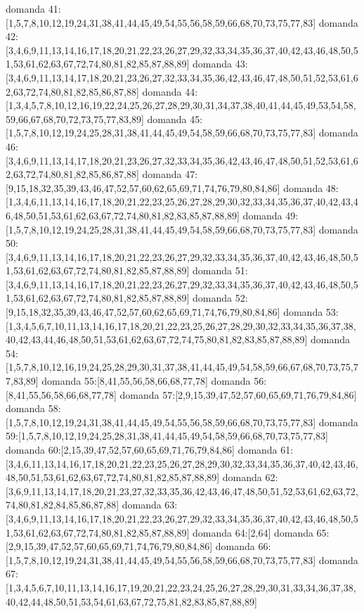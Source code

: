 domanda 41:[1,5,7,8,10,12,19,24,31,38,41,44,45,49,54,55,56,58,59,66,68,70,73,75,77,83]
domanda 42:[3,4,6,9,11,13,14,16,17,18,20,21,22,23,26,27,29,32,33,34,35,36,37,40,42,43,46,48,50,51,53,61,62,63,67,72,74,80,81,82,85,87,88,89]
domanda 43:[3,4,6,9,11,13,14,17,18,20,21,23,26,27,32,33,34,35,36,42,43,46,47,48,50,51,52,53,61,62,63,72,74,80,81,82,85,86,87,88]
domanda 44:[1,3,4,5,7,8,10,12,16,19,22,24,25,26,27,28,29,30,31,34,37,38,40,41,44,45,49,53,54,58,59,66,67,68,70,72,73,75,77,83,89]
domanda 45:[1,5,7,8,10,12,19,24,25,28,31,38,41,44,45,49,54,58,59,66,68,70,73,75,77,83]
domanda 46:[3,4,6,9,11,13,14,17,18,20,21,23,26,27,32,33,34,35,36,42,43,46,47,48,50,51,52,53,61,62,63,72,74,80,81,82,85,86,87,88]
domanda 47:[9,15,18,32,35,39,43,46,47,52,57,60,62,65,69,71,74,76,79,80,84,86]
domanda 48:[1,3,4,6,11,13,14,16,17,18,20,21,22,23,25,26,27,28,29,30,32,33,34,35,36,37,40,42,43,46,48,50,51,53,61,62,63,67,72,74,80,81,82,83,85,87,88,89]
domanda 49:[1,5,7,8,10,12,19,24,25,28,31,38,41,44,45,49,54,58,59,66,68,70,73,75,77,83]
domanda 50:[3,4,6,9,11,13,14,16,17,18,20,21,22,23,26,27,29,32,33,34,35,36,37,40,42,43,46,48,50,51,53,61,62,63,67,72,74,80,81,82,85,87,88,89]
domanda 51:[3,4,6,9,11,13,14,16,17,18,20,21,22,23,26,27,29,32,33,34,35,36,37,40,42,43,46,48,50,51,53,61,62,63,67,72,74,80,81,82,85,87,88,89]
domanda 52:[9,15,18,32,35,39,43,46,47,52,57,60,62,65,69,71,74,76,79,80,84,86]
domanda 53:[1,3,4,5,6,7,10,11,13,14,16,17,18,20,21,22,23,25,26,27,28,29,30,32,33,34,35,36,37,38,40,42,43,44,46,48,50,51,53,61,62,63,67,72,74,75,80,81,82,83,85,87,88,89]
domanda 54:[1,5,7,8,10,12,16,19,24,25,28,29,30,31,37,38,41,44,45,49,54,58,59,66,67,68,70,73,75,77,83,89]
domanda 55:[8,41,55,56,58,66,68,77,78]
domanda 56:[8,41,55,56,58,66,68,77,78]
domanda 57:[2,9,15,39,47,52,57,60,65,69,71,76,79,84,86]
domanda 58:[1,5,7,8,10,12,19,24,31,38,41,44,45,49,54,55,56,58,59,66,68,70,73,75,77,83]
domanda 59:[1,5,7,8,10,12,19,24,25,28,31,38,41,44,45,49,54,58,59,66,68,70,73,75,77,83]
domanda 60:[2,15,39,47,52,57,60,65,69,71,76,79,84,86]
domanda 61:[3,4,6,11,13,14,16,17,18,20,21,22,23,25,26,27,28,29,30,32,33,34,35,36,37,40,42,43,46,48,50,51,53,61,62,63,67,72,74,80,81,82,85,87,88,89]
domanda 62:[3,6,9,11,13,14,17,18,20,21,23,27,32,33,35,36,42,43,46,47,48,50,51,52,53,61,62,63,72,74,80,81,82,84,85,86,87,88]
domanda 63:[3,4,6,9,11,13,14,16,17,18,20,21,22,23,26,27,29,32,33,34,35,36,37,40,42,43,46,48,50,51,53,61,62,63,67,72,74,80,81,82,85,87,88,89]
domanda 64:[2,64]
domanda 65:[2,9,15,39,47,52,57,60,65,69,71,74,76,79,80,84,86]
domanda 66:[1,5,7,8,10,12,19,24,31,38,41,44,45,49,54,55,56,58,59,66,68,70,73,75,77,83]
domanda 67:[1,3,4,5,6,7,10,11,13,14,16,17,19,20,21,22,23,24,25,26,27,28,29,30,31,33,34,36,37,38,40,42,44,48,50,51,53,54,61,63,67,72,75,81,82,83,85,87,88,89]
